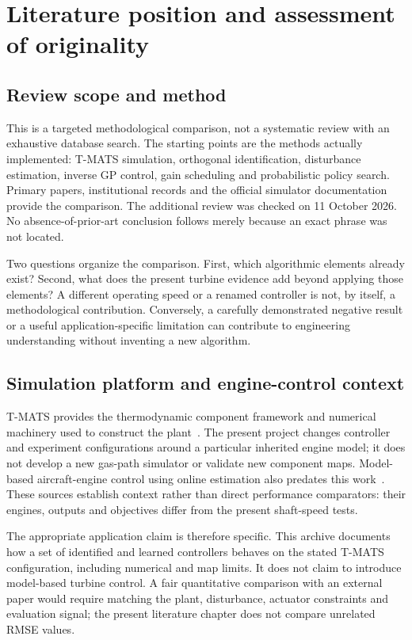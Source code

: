\chapter{Literature position and assessment of originality}
\label{ch:literature}
\section{Review scope and method}
This is a targeted methodological comparison, not a systematic review with an exhaustive database search. The starting points are the methods actually implemented: T-MATS simulation, orthogonal identification, disturbance estimation, inverse GP control, gain scheduling and probabilistic policy search. Primary papers, institutional records and the official simulator documentation provide the comparison. The additional review was checked on 11 October 2026. No absence-of-prior-art conclusion follows merely because an exact phrase was not located.

Two questions organize the comparison. First, which algorithmic elements already exist? Second, what does the present turbine evidence add beyond applying those elements? A different operating speed or a renamed controller is not, by itself, a methodological contribution. Conversely, a carefully demonstrated negative result or a useful application-specific limitation can contribute to engineering understanding without inventing a new algorithm.

\section{Simulation platform and engine-control context}
T-MATS provides the thermodynamic component framework and numerical machinery used to construct the plant~\cite{tmats,tmatsguide}. The present project changes controller and experiment configurations around a particular inherited engine model; it does not develop a new gas-path simulator or validate new component maps. Model-based aircraft-engine control using online estimation also predates this work~\cite{nasaengine}. These sources establish context rather than direct performance comparators: their engines, outputs and objectives differ from the present shaft-speed tests.

The appropriate application claim is therefore specific. This archive documents how a set of identified and learned controllers behaves on the stated T-MATS configuration, including numerical and map limits. It does not claim to introduce model-based turbine control. A fair quantitative comparison with an external paper would require matching the plant, disturbance, actuator constraints and evaluation signal; the present literature chapter does not compare unrelated RMSE values.


